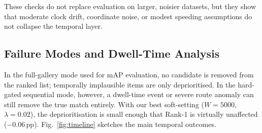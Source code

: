 \documentclass{ijitcs}
\newcommand{\rev}[1]{#1}
\begin{document}
\rev{These checks do not replace evaluation on larger, noisier datasets, but they show that moderate clock drift, coordinate noise, or modest speeding assumptions do not collapse the temporal layer.}

\subsection{Failure Modes and Dwell-Time Analysis}
\rev{In the full-gallery mode used for mAP evaluation, no candidate is removed from the ranked list; temporally implausible items are only deprioritised. In the hard-gated sequential mode, however, a dwell-time event or severe route anomaly can still remove the true match entirely. With our best soft-setting ($W=5000$, $\lambda = 0.02$), the deprioritisation is small enough that Rank-1 is virtually unaffected ($-$0.06\,pp). Fig.~\ref{fig:timeline} sketches the main temporal outcomes.}
\end{document}
